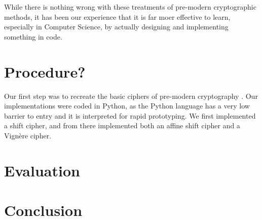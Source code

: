 \documentclass[11pt]{article}
\begin{document}
\vspace{3mm}

While there is nothing wrong with these treatments of pre-modern cryptographic methods, it has been our experience that it is far moer effective to learn, especially in Computer Science, by actually designing and implementing something in code.


	

\section{Procedure?}%
\hspace{4mm}	
Our first step was to recreate the basic ciphers of pre-modern cryptography \cite{Alice-and-Bob}.  
Our implementations were coded in Python, as the Python language has a very low barrier to entry and it is interpreted for rapid prototyping.  
We first implemented a shift cipher, and from there implemented both an affine shift cipher and a Vign\`ere cipher.  
\section{Evaluation}

\section{Conclusion}


{}

\end{document}

